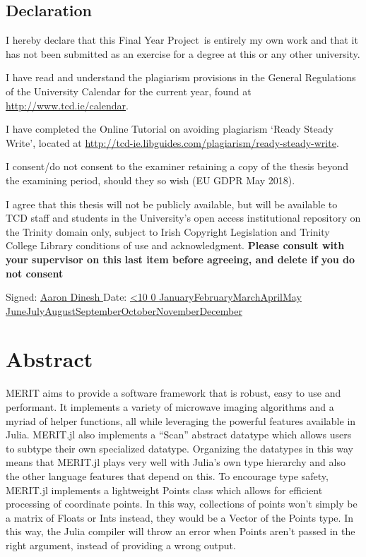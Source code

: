 \documentclass[a4paper,oneside,12pt]{book}
\title{\thesistitle}
\author{\authorname}
\newcommand{\typeofthesis}{Final Year Project} %
\numberwithin{equation}{chapter} %
\renewcommand{\today}{\ifnum\number\day<10 0\fi \number\day \space%
\ifcase \month \or January\or February\or March\or April\or May%
\or June\or July\or August\or September\or October\or November\or December\fi \space%
\number \year}
\begin{document}

\section*{\Huge\textcolor{tcd_blue}{Declaration}}
\vspace{1cm}
I hereby declare that this \typeofthesis\ is entirely my own work and that it has not been submitted as an exercise for
a degree at this or any other university.

\vspace{1cm}
I have read and understand the plagiarism provisions in the General Regulations of the University Calendar for the
current year, found at \url{http://www.tcd.ie/calendar}.
\vspace{1cm}

I have completed the Online Tutorial on avoiding plagiarism `Ready Steady Write', located at
\url{http://tcd-ie.libguides.com/plagiarism/ready-steady-write}.
\vspace{1cm}

I consent/do not consent to the examiner retaining a copy of the thesis beyond the examining period, should they so
wish (EU GDPR May 2018).
\vspace{1cm}

I agree that this thesis will not be publicly available, but will be available to TCD staff and students in the
University’s open access institutional repository on the Trinity domain only, subject to Irish Copyright Legislation and
Trinity College Library conditions of use and acknowledgment.  \textbf{Please consult with your supervisor on this last
item before agreeing, and delete if you do not consent}
\vspace{3cm}

Signed: \uline{\hfill Aaron Dinesh \hfill} Date: \uline{\hfill \today \hfill}

\chapter*{Abstract}
MERIT aims to provide a software framework that is robust, easy to use and performant. It implements a variety of
microwave imaging algorithms and a myriad of helper functions, all while leveraging the powerful features available in
Julia. MERIT.jl also implements a ``Scan'' abstract datatype which allows users to subtype their own specialized datatype.
Organizing the datatypes in this way means that MERIT.jl plays very well with Julia's own type hierarchy and also the
other language features that depend on this. To encourage type safety, MERIT.jl implements a lightweight Points class
which allows for efficient processing of coordinate points. In this way, collections of points won't simply be a matrix
of Floats or Ints instead, they would be a Vector of the Points type. In this way, the Julia compiler will throw an
error when Points aren't passed in the right argument, instead of providing a wrong output.      
\newpage
\end{document}
